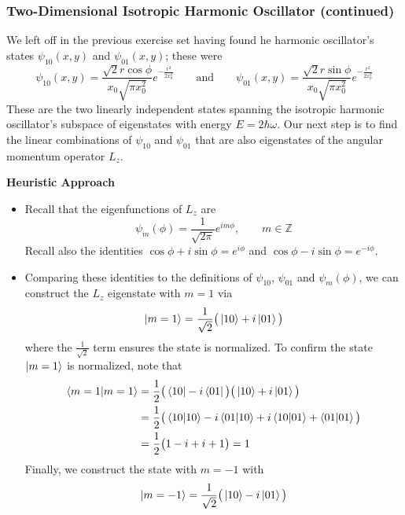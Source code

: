 \documentclass[11pt, a4paper]{article}
\newcommand{\eqtext}[1]{\qquad \text{#1} \qquad}
\begin{document}
\subsubsection{Two-Dimensional Isotropic Harmonic Oscillator (continued)}
We left off in the previous exercise set having found he harmonic oscillator's states $ \psi_{10}(x,y) $ and $ \psi_{01}(x, y) $; these were
\begin{equation*}
	\psi_{10}(x, y) = \frac{\sqrt{2}r \cos \phi}{x_{0}\sqrt{\pi x_{0}^{2}}}e^{-\frac{r^{2}}{2x_{0}^{2}}} \eqtext{and} \psi_{01}(x, y) = \frac{\sqrt{2}r \sin \phi}{x_{0}\sqrt{\pi x_{0}^{2}}}e^{-\frac{r^{2}}{2x_{0}^{2}}}
\end{equation*}
These are the two linearly independent states spanning the isotropic harmonic oscillator's subspace of eigenstates with energy $ E = 2\hbar \omega $. Our next step is to find the linear combinations of $ \psi_{10} $ and $ \psi_{01} $ that are also eigenstates of the angular momentum operator $ L_{z} $. 
	
\vspace{2mm}
\textbf{Heuristic Approach}
\begin{itemize}
	\item Recall that the eigenfunctions of $ L_{z} $ are 
	\begin{equation*}
		\psi_{m}(\phi) = \frac{1}{\sqrt{2\pi}}e^{im\phi}, \qquad m \in \mathbb{Z}
	\end{equation*}
	Recall also the identities $ \cos \phi + i \sin \phi = e^{i\phi} $ and $ \cos \phi - i \sin \phi = e^{-i\phi} $. 
	
	\item Comparing these identities to the definitions of $ \psi_{10} $, $ \psi_{01} $ and $ \psi_{m}(\phi) $, we can construct the $ L_{z} $ eigenstate with $ m = 1 $ via
	\begin{equation*}
		\ket{m=1} = \frac{1}{\sqrt{2}}\big(\ket{10} + i\ket{01}\big)
	\end{equation*}
	where the $ \frac{1}{\sqrt{2}} $ term ensures the state is normalized. To confirm the state $ \ket{m=1} $ is normalized, note that
	\begin{align*}
		\braket{m=1}{m=1} &= \frac{1}{2}\big(\bra{10} - i\bra{01}\big)\big(\ket{10} + i\ket{01}\big)\\
		&= \frac{1}{2}\big(\braket{10}{10} - i \braket{01}{10} + i\braket{10}{01} + \braket{01}{01}\big)\\
		&=\frac{1}{2}\big(1 -i + i + 1\big) = 1
	\end{align*}
	Finally, we construct the state with $ m = -1 $ with
	\begin{equation*}
		\ket{m=-1} = \frac{1}{\sqrt{2}} \big(\ket{10} - i \ket{01}\big)
	\end{equation*}
	
\end{itemize}
\end{document}
